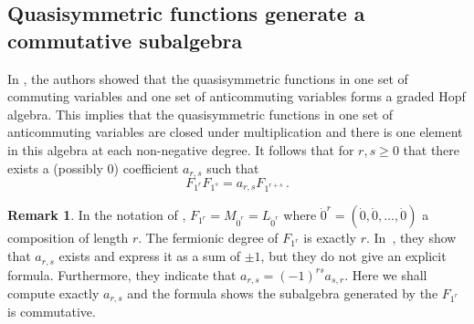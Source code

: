 \documentclass[11pt]{amsart}
\theoremstyle{definition}
\newtheorem{remark}[theorem]{Remark}
\numberwithin{equation}{section}
\begin{document}
\subsection{Quasisymmetric functions generate a commutative subalgebra}
In \cite{FLP}, the authors showed that the quasisymmetric functions in
one set of commuting variables and one set of anticommuting variables
forms a graded Hopf algebra.  This implies that the quasisymmetric functions
in one set of anticommuting variables are closed under multiplication
and there is one element in this algebra at each non-negative degree.
It follows that for $r, s \geq0$ that there exists a (possibly $0$)
coefficient $a_{r,s}$ such that
\begin{equation}\label{eq:qsalg}
F_{1^r} F_{1^s} = a_{r,s} F_{1^{r+s}}\,.
\end{equation}

\begin{remark}
In  the notation of \cite{FLP}, $F_{1^r}=M_{\dot{0}^r}=L_{\dot{0}^r}$ where $\dot{0}^r=(\dot{0},\dot{0},\ldots,\dot{0})$ a composition of length $r$.
The fermionic degree of $F_{1^r}$ is exactly $r$.
 In~\cite{FLP}, they show that $a_{r,s}$ exists and express it as a sum of $\pm 1$, but they do not give an explicit formula.
Furthermore, they indicate  that $a_{r,s}=(-1)^{rs}a_{s,r}$. Here we shall compute exactly $a_{r,s}$
and the formula shows the subalgebra generated by the $F_{1^r}$ is commutative.
\end{remark}
\end{document}
